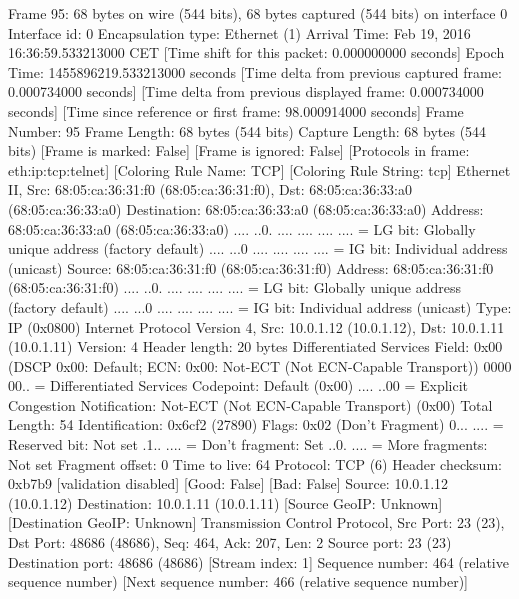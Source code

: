 Frame 95: 68 bytes on wire (544 bits), 68 bytes captured (544 bits) on interface 0
    Interface id: 0
    Encapsulation type: Ethernet (1)
    Arrival Time: Feb 19, 2016 16:36:59.533213000 CET
    [Time shift for this packet: 0.000000000 seconds]
    Epoch Time: 1455896219.533213000 seconds
    [Time delta from previous captured frame: 0.000734000 seconds]
    [Time delta from previous displayed frame: 0.000734000 seconds]
    [Time since reference or first frame: 98.000914000 seconds]
    Frame Number: 95
    Frame Length: 68 bytes (544 bits)
    Capture Length: 68 bytes (544 bits)
    [Frame is marked: False]
    [Frame is ignored: False]
    [Protocols in frame: eth:ip:tcp:telnet]
    [Coloring Rule Name: TCP]
    [Coloring Rule String: tcp]
Ethernet II, Src: 68:05:ca:36:31:f0 (68:05:ca:36:31:f0), Dst: 68:05:ca:36:33:a0 (68:05:ca:36:33:a0)
    Destination: 68:05:ca:36:33:a0 (68:05:ca:36:33:a0)
        Address: 68:05:ca:36:33:a0 (68:05:ca:36:33:a0)
        .... ..0. .... .... .... .... = LG bit: Globally unique address (factory default)
        .... ...0 .... .... .... .... = IG bit: Individual address (unicast)
    Source: 68:05:ca:36:31:f0 (68:05:ca:36:31:f0)
        Address: 68:05:ca:36:31:f0 (68:05:ca:36:31:f0)
        .... ..0. .... .... .... .... = LG bit: Globally unique address (factory default)
        .... ...0 .... .... .... .... = IG bit: Individual address (unicast)
    Type: IP (0x0800)
Internet Protocol Version 4, Src: 10.0.1.12 (10.0.1.12), Dst: 10.0.1.11 (10.0.1.11)
    Version: 4
    Header length: 20 bytes
    Differentiated Services Field: 0x00 (DSCP 0x00: Default; ECN: 0x00: Not-ECT (Not ECN-Capable Transport))
        0000 00.. = Differentiated Services Codepoint: Default (0x00)
        .... ..00 = Explicit Congestion Notification: Not-ECT (Not ECN-Capable Transport) (0x00)
    Total Length: 54
    Identification: 0x6cf2 (27890)
    Flags: 0x02 (Don't Fragment)
        0... .... = Reserved bit: Not set
        .1.. .... = Don't fragment: Set
        ..0. .... = More fragments: Not set
    Fragment offset: 0
    Time to live: 64
    Protocol: TCP (6)
    Header checksum: 0xb7b9 [validation disabled]
        [Good: False]
        [Bad: False]
    Source: 10.0.1.12 (10.0.1.12)
    Destination: 10.0.1.11 (10.0.1.11)
    [Source GeoIP: Unknown]
    [Destination GeoIP: Unknown]
Transmission Control Protocol, Src Port: 23 (23), Dst Port: 48686 (48686), Seq: 464, Ack: 207, Len: 2
    Source port: 23 (23)
    Destination port: 48686 (48686)
    [Stream index: 1]
    Sequence number: 464    (relative sequence number)
    [Next sequence number: 466    (relative sequence number)]
